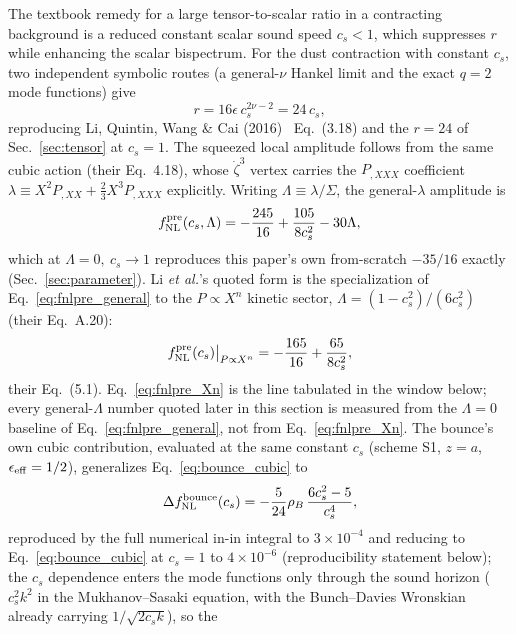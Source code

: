 \documentclass[aps,prd,twocolumn,superscriptaddress,nofootinbib,longbibliography]{revtex4-2}
\newcommand{\fnl}{f_{\rm NL}}
\begin{document}
The textbook remedy for a large tensor-to-scalar ratio in a contracting
background is a reduced constant scalar sound speed $c_s<1$, which
suppresses $r$ while enhancing the scalar bispectrum. For the dust
contraction with constant $c_s$, two independent symbolic routes (a
general-$\nu$ Hankel limit and the exact $q=2$ mode functions) give
\begin{equation}
r=16\epsilon\,c_s^{2\nu-2}=24\,c_s,
\end{equation}
reproducing Li, Quintin, Wang \& Cai (2016)~\cite{Li2016} Eq.~(3.18) and
the $r=24$ of Sec.~\ref{sec:tensor} at $c_s=1$. The squeezed local
amplitude follows from the same cubic action (their Eq.~4.18), whose
$\dot\zeta^3$ vertex carries the $P_{,XXX}$ coefficient
$\lambda\equiv X^2P_{,XX}+\tfrac{2}{3}X^3P_{,XXX}$ explicitly. Writing
$\Lambda\equiv\lambda/\Sigma$, the general-$\lambda$ amplitude is
\begin{equation}
\fnl^{\rm pre}(c_s,\Lambda)=-\frac{245}{16}+\frac{105}{8c_s^2}-30\Lambda ,
\label{eq:fnlpre_general}
\end{equation}
which at $\Lambda=0,\ c_s\to1$ reproduces this paper's own from-scratch
$-35/16$ exactly (Sec.~\ref{sec:parameter}). Li \textit{et al.}'s
quoted form is the specialization of
Eq.~\eqref{eq:fnlpre_general} to the $P\propto X^n$ kinetic sector,
$\Lambda=(1-c_s^2)/(6c_s^2)$ (their Eq.~A.20):
\begin{equation}
\fnl^{\rm pre}(c_s)\big|_{P\propto X^{n}}
=-\frac{165}{16}+\frac{65}{8c_s^2},
\label{eq:fnlpre_Xn}
\end{equation}
their Eq.~(5.1). Eq.~\eqref{eq:fnlpre_Xn} is the line tabulated in the
window below; every general-$\Lambda$ number quoted later in this section
is measured from the $\Lambda=0$ baseline of
Eq.~\eqref{eq:fnlpre_general}, not from Eq.~\eqref{eq:fnlpre_Xn}. The bounce's own cubic contribution, evaluated at the same constant
$c_s$ (scheme S1, $z=a$, $\epsilon_{\rm eff}=1/2$), generalizes
Eq.~\eqref{eq:bounce_cubic} to
\begin{equation}
\Delta\fnl^{\rm bounce}(c_s)=-\frac{5}{24}\rho_B\,\frac{6c_s^2-5}{c_s^4},
\label{eq:bounce_cubic_cs}
\end{equation}
reproduced by the full numerical in-in integral to $3\times10^{-4}$ and
reducing to Eq.~\eqref{eq:bounce_cubic} at $c_s=1$ to $4\times10^{-6}$
(reproducibility statement below); the
$c_s$ dependence enters the mode functions only through the sound
horizon ($c_s^2k^2$ in the Mukhanov--Sasaki equation, with the
Bunch--Davies Wronskian already carrying $1/\sqrt{2c_sk}$), so the
\end{document}
